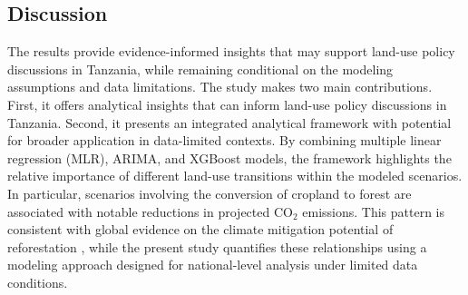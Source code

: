 \documentclass[10pt,letterpaper]{article}
\begin{document}
\subsection{Discussion}
The results provide evidence-informed insights that may support land-use policy discussions in Tanzania, while remaining conditional on the modeling assumptions and data limitations. The study makes two main contributions. First, it offers analytical insights that can inform land-use policy discussions in Tanzania. Second, it presents an integrated analytical framework with potential for broader application in data-limited contexts. By combining multiple linear regression (MLR), ARIMA, and XGBoost models, the framework highlights the relative importance of different land-use transitions within the modeled scenarios. In particular, scenarios involving the conversion of cropland to forest are associated with notable reductions in projected CO$_2$ emissions. This pattern is consistent with global evidence on the climate mitigation potential of reforestation \cite{psistaki2024overview, raihan2024review}, while the present study quantifies these relationships using a modeling approach designed for national-level analysis under limited data conditions.
\end{document}

